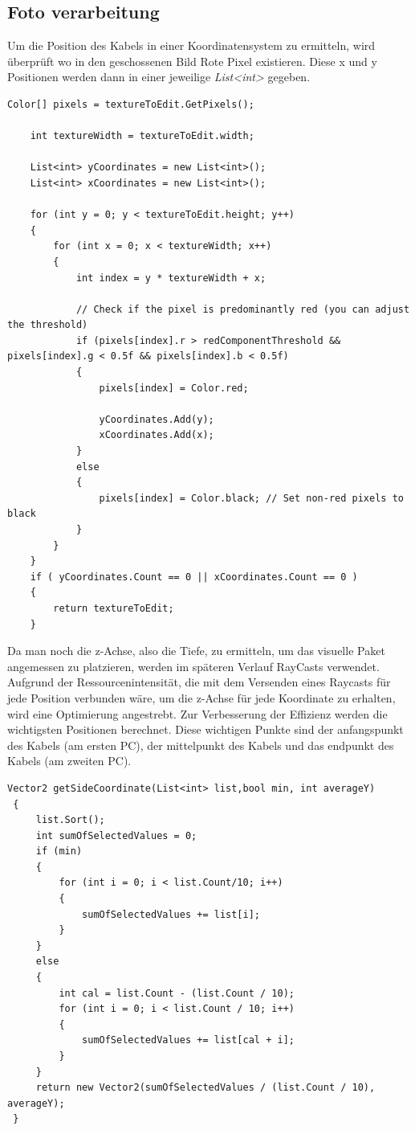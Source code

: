 \subsection*{Foto verarbeitung}
Um die Position des Kabels in einer Koordinatensystem zu ermitteln, wird überprüft wo
in den geschossenen Bild Rote Pixel existieren. Diese x und y Positionen werden dann
in einer jeweilige \textit{List<int>} gegeben.
\begin{lstlisting}[style=csharp, caption={}, label=code:editTexture]
    Color[] pixels = textureToEdit.GetPixels();

    int textureWidth = textureToEdit.width;

    List<int> yCoordinates = new List<int>();
    List<int> xCoordinates = new List<int>();

    for (int y = 0; y < textureToEdit.height; y++)
    {
        for (int x = 0; x < textureWidth; x++)
        {
            int index = y * textureWidth + x;

            // Check if the pixel is predominantly red (you can adjust the threshold)
            if (pixels[index].r > redComponentThreshold && pixels[index].g < 0.5f && pixels[index].b < 0.5f)
            {
                pixels[index] = Color.red;

                yCoordinates.Add(y);
                xCoordinates.Add(x);
            }
            else
            {
                pixels[index] = Color.black; // Set non-red pixels to black
            }
        }
    }
    if ( yCoordinates.Count == 0 || xCoordinates.Count == 0 )
    {
        return textureToEdit;
    }
\end{lstlisting}
Da man noch die z-Achse, also die Tiefe, zu ermitteln, um das visuelle Paket angemessen zu platzieren, werden
im späteren Verlauf RayCasts verwendet. Aufgrund der Ressourcenintensität, die mit dem Versenden eines Raycasts
für jede Position verbunden wäre, um die z-Achse für jede Koordinate zu erhalten, wird eine Optimierung angestrebt.
Zur Verbesserung der Effizienz werden die wichtigsten Positionen berechnet. Diese wichtigen Punkte sind der
anfangspunkt des Kabels (am ersten PC), der mittelpunkt des Kabels und das endpunkt des Kabels (am zweiten PC).\\

\begin{lstlisting}[style=csharp, caption={}, label=code:getSideCoordinate]
Vector2 getSideCoordinate(List<int> list,bool min, int averageY)
 {
     list.Sort();
     int sumOfSelectedValues = 0;
     if (min)
     {
         for (int i = 0; i < list.Count/10; i++)
         {
             sumOfSelectedValues += list[i];
         }
     }
     else
     {
         int cal = list.Count - (list.Count / 10);
         for (int i = 0; i < list.Count / 10; i++)
         {
             sumOfSelectedValues += list[cal + i];
         }
     }
     return new Vector2(sumOfSelectedValues / (list.Count / 10), averageY);
 }
\end{lstlisting}

